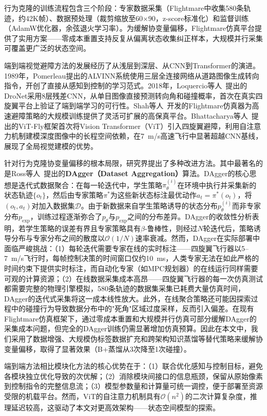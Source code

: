 \documentclass[12pt,a4paper]{article}
\numberwithin{equation}{section}
\numberwithin{figure}{section}
\numberwithin{table}{section}
\begin{document}
行为克隆的训练流程包含三个阶段：专家数据采集（Flightmare中收集580条轨迹，约42K帧）、数据预处理（裁剪缩放至60$\times$90，z-score标准化）和监督训练（AdamW优化器，余弦退火学习率）。为缓解协变量偏移，Flightmare仿真平台提供了实用方案——零成本重置支持反复从偏离状态收集纠正样本，大规模并行采集可覆盖更广泛的状态空间。

端到端视觉避障方法的发展经历了从浅层到深层、从CNN到Transformer的演进。1989年，Pomerleau提出的ALVINN系统使用三层全连接网络从道路图像生成转向指令，开创了直接从感知到控制的学习范式。2018年，Loquercio等人~\cite{loquercio2018dronet}提出的DroNet采用8层残差CNN，从单目图像直接预测转向角和碰撞概率，首次在真实四旋翼平台上验证了端到端学习的可行性。Shah等人~\cite{shah2017flightmare}开发的Flightmare仿真器为高速避障策略的大规模训练提供了灵活可扩展的高保真平台。Bhattacharya等人~\cite{bhattacharya2024vitfly}提出的ViT-Fly框架首次将Vision Transformer（ViT）引入四旋翼避障，利用自注意力机制建模深度图像中的长程空间依赖，在7~m/s高速飞行中显著超越CNN基线，展现了全局视觉建模的优势。

针对行为克隆协变量偏移的根本局限，研究界提出了多种改进方法。其中最著名的是Ross等人~\cite{ross2011dagger}提出的\textbf{DAgger（Dataset Aggregation）}算法。DAgger的核心思想是迭代式数据聚合：在每一轮迭代中，学生策略$\pi_{\theta}^{(i)}$在环境中执行并采集新的状态轨迹$\{o_t\}$，然后由专家策略$\pi^*$为这些新状态标注最优动作$a_t = \pi^*(o_t)$，将$(o_t, a_t)$对加入数据集$\mathcal{D}$。由于新数据来自学生策略诱导的状态分布$p_{\theta}^{(i)}$而非专家分布$p_{\text{exp}}$，训练过程逐渐弥合了$p_{\theta}$与$p_{\text{exp}}$之间的分布差异。DAgger的收敛性分析表明，若学生策略的误差有界且专家策略具有$\beta$-鲁棒性，则经过$N$轮迭代后，策略诱导分布与专家分布之间的散度以$\mathcal{O}(1/N)$速率衰减。然而，DAgger在实际部署中面临严峻挑战：（1）每轮迭代需要专家在线的实时标注——四旋翼飞行器以5--7~m/s飞行时，每帧控制决策的时间窗口仅约10~ms，人类专家无法在如此严格的时间约束下提供实时标注，而自动化专家（如MPC规划器）的在线运行同样需要可观的计算资源；（2）在线数据采集成本高昂——四旋翼飞行器的每一次仿真测试都需要完整的物理引擎模拟，580条轨迹的数据集采集已耗费大量仿真时间，DAgger的迭代式采集将这一成本线性放大。此外，在线聚合策略还可能因探索过程中的碰撞行为导致数据分布中的"死角"区域过度采样，反而引入偏差。在现有Flightmare仿真框架下，通过零成本重置和大规模并行仿真可部分缓解DAgger的采集成本问题，但完全的DAgger训练仍需显著增加仿真预算。因此在本文中，我们采用了数据增强、大规模伪标签数据扩充和跨架构知识蒸馏等替代策略来缓解协变量偏移，取得了显著效果（B+蒸馏从3次降至1次碰撞）。

端到端方法相比模块化方法的核心优势在于：（1）联合优化感知与控制目标，避免各模块独立优化导致的次优解；（2）消除模块间接口的信息瓶颈，保留从原始像素到控制指令的完整信息流；（3）模型参数量和计算量可统一调控，便于部署至资源受限的机载平台。然而，ViT的自注意力机制具有$\mathcal{O}(n^2)$的二次计算复杂度，推理延迟较高，这驱动了本文对更高效架构——状态空间模型的探索。
\end{document}
